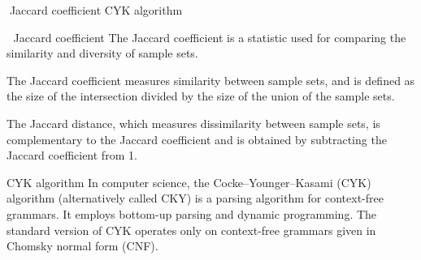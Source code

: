 
Jaccard coefficient
CYK algorithm


Jaccard coefficient
The Jaccard coefficient is a statistic used for comparing the similarity and diversity of sample sets.

The Jaccard coefficient measures similarity between sample sets, and is defined as the size of the intersection divided by the size of the union of the sample sets.

The Jaccard distance, which measures dissimilarity between sample sets, is complementary to the Jaccard coefficient and is obtained by subtracting the Jaccard coefficient from 1.

CYK algorithm
In computer science, the Cocke–Younger–Kasami (CYK) algorithm (alternatively called CKY) is a parsing algorithm for context-free grammars. It employs bottom-up parsing and dynamic programming. The standard version of CYK operates only on context-free grammars given in Chomsky normal form (CNF).

